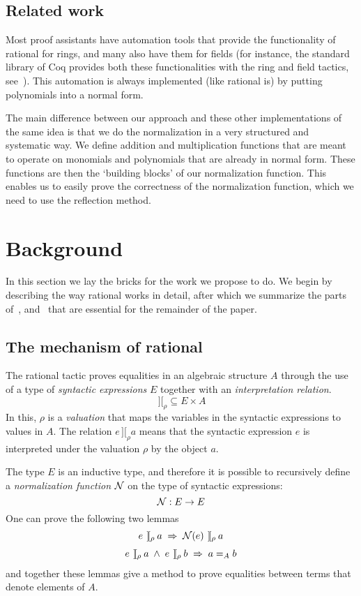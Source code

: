 \documentclass{article}
\newcommand{\intII}{\,]\![}
\newcommand{\intrel}{\mathbin{\intII_{\rho}}}
\newcommand{\N}{{\cal N}}
\newcommand{\tacticname}[1]{\textsf{#1}}
\newcommand{\rational}{\tacticname{rational}}
\begin{document}
\subsection{Related work}

Most proof assistants have automation tools that provide the functionality
of {\rational} for rings, and many also have them for fields
(for instance, the standard library of Coq provides both these
functionalities with the
\tacticname{ring} and \tacticname{field} tactics, see~\cite{coqmanual}).
This automation is always implemented (like {\rational} is)
by putting polynomials into a normal form.

The main difference between our approach and these other implementations
of the same idea is that we do the normalization in a very structured
and systematic way.
We define addition and multiplication functions
that are meant to operate on monomials and polynomials that are already
in normal form.
These functions are then the `building blocks' of our normalization
function.
This enables us to easily prove the correctness of the normalization
function, which we need to use the reflection method.

\section{Background}

In this section we lay the bricks for the work we propose to do.  We begin
by describing the way {\rational} works in detail, after which we
summarize the parts of~\cite{geu:pol:wie:zwa:02}, \cite{geu:wie:zwa:00}
and~\cite{lcf:wie:04} that are essential for the remainder of the paper.

\subsection{The mechanism of {\rational}}\label{tactic}

The {\rational} tactic proves equalities in an algebraic
structure $A$ through the use of a type of \emph{syntactic expressions} $E$
together with an \emph{interpretation relation}.
$$\intrel \subseteq E \times A$$
In this, $\rho$ is a \emph{valuation} that maps the variables in the
syntactic expressions to values in $A$.
The relation $e \intrel a$ means that the syntactic expression
$e$ is interpreted under the valuation $\rho$ by the object $a$.

The type $E$ is an inductive type, and therefore it is possible to recursively
define a \emph{normalization function} $\N$ on the type of syntactic
expressions:
$$\N : E \to E$$
One can prove the following two lemmas
$$
\begin{array}{c}
e \intrel a \;\Rightarrow\; \N(e) \intrel a \\
\noalign{\medskip}
e \intrel a \;\land\; e \intrel b \;\Rightarrow\; a =_A b
\end{array}
$$
and together these lemmas give a method to prove equalities between terms
that denote elements of $A$.
\end{document}
